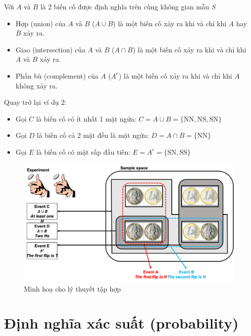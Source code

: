 \documentclass[
]{book}
\providecommand{\tightlist}{%
  \setlength{\itemsep}{0pt}\setlength{\parskip}{0pt}}
\begin{document}
Với \(A\) và \(B\) là 2 biến cố được định nghĩa trên cùng không gian mẫu \(S\)

\begin{itemize}
\tightlist
\item
  Hợp (union) của \(A\) và \(B\) (\(A \cup B\)) là một biến cố xảy ra khi và chỉ khi \(A\) hay \(B\) xảy ra.
\item
  Giao (intersection) của \(A\) và \(B\) (\(A \cap B\)) là một biến cố xảy ra khi và chỉ khi \(A\) và \(B\) xảy ra.
\item
  Phần bù (complement) của \(A\) (\(A^c\)) là một biến cố xảy ra khi và chỉ khi \(A\) không xảy ra.
\end{itemize}

Quay trở lại ví dụ 2:

\begin{itemize}
\tightlist
\item
  Gọi \(C\) là biến cố có ít nhất 1 mặt ngửa: \(C = A \cup B = \{\text{NN},\text{NS},\text{SN}\}\)
\item
  Gọi \(D\) là biến cố cả 2 mặt đều là mặt ngửa: \(D = A \cap B = \{\text{NN}\}\)
\item
  Gọi \(E\) là biến cố có mặt sấp đầu tiên: \(E = A^c = \{\text{SN},\text{SS}\}\)
\end{itemize}

\begin{figure}

{\centering \includegraphics[width=1\linewidth]{figures/Picture03} 

}

\caption{Minh hoạ cho lý thuyết tập hợp}\label{fig:example3}
\end{figure}

\hypertarget{ux111ux1ecbnh-nghux129a-xuxe1c-suux1ea5t-probability}{%
\section{Định nghĩa xác suất (probability)}\label{ux111ux1ecbnh-nghux129a-xuxe1c-suux1ea5t-probability}}
\end{document}
